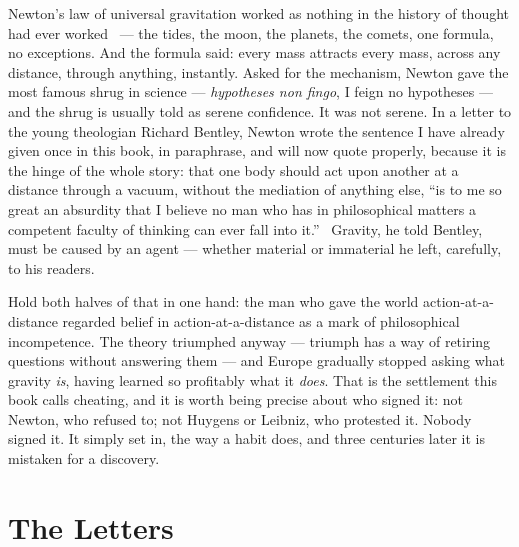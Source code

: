 \documentclass[fontsize=11pt,paper=a4,pagesize=auto,parskip=half-]{scrbook}
\begin{document}
Newton's law of universal gravitation worked as nothing in the history of thought had ever worked~\cite{newton1687} --- the tides, the moon, the planets, the comets, one formula, no exceptions. And the formula said: every mass attracts every mass, across any distance, through anything, instantly. Asked for the mechanism, Newton gave the most famous shrug in science --- \emph{hypotheses non fingo}, I feign no hypotheses --- and the shrug is usually told as serene confidence. It was not serene. In a letter to the young theologian Richard Bentley, Newton wrote the sentence I have already given once in this book, in paraphrase, and will now quote properly, because it is the hinge of the whole story: that one body should act upon another at a distance through a vacuum, without the mediation of anything else, ``is to me so great an absurdity that I believe no man who has in philosophical matters a competent faculty of thinking can ever fall into it.''~\cite{janiak2014} Gravity, he told Bentley, must be caused by an agent --- whether material or immaterial he left, carefully, to his readers.

Hold both halves of that in one hand: the man who gave the world action-at-a-distance regarded belief in action-at-a-distance as a mark of philosophical incompetence. The theory triumphed anyway --- triumph has a way of retiring questions without answering them --- and Europe gradually stopped asking what gravity \emph{is}, having learned so profitably what it \emph{does}. That is the settlement this book calls cheating, and it is worth being precise about who signed it: not Newton, who refused to; not Huygens or Leibniz, who protested it. Nobody signed it. It simply set in, the way a habit does, and three centuries later it is mistaken for a discovery.

\section{The Letters}
\end{document}
